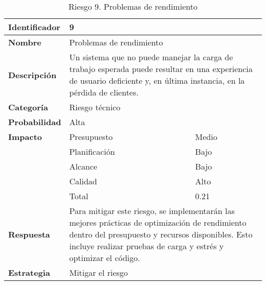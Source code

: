 \begin{table}[H]
    \centering
    \caption{Riesgo 9. Problemas de rendimiento}
    \label{table:risk_rendimiento}
    \begin{tabular}{>{\columncolor{lightgreen!20}}l l l}
    \toprule
    \rowcolor{lightgreen}
    \textbf{Identificador} & \multicolumn{2}{l}{9} \\
    \midrule
    \textbf{Nombre} & \multicolumn{2}{l}{Problemas de rendimiento} \\
    \midrule
    \textbf{Descripción} & \multicolumn{2}{p{10cm}}{Un sistema que no puede manejar la carga de trabajo esperada puede resultar en una experiencia de usuario deficiente y,
    en última instancia, en la pérdida de clientes.} \\
    \midrule
    \textbf{Categoría} & \multicolumn{2}{l}{Riesgo técnico} \\
    \midrule
    \textbf{Probabilidad} & \multicolumn{2}{l}{Alta} \\
    \midrule
    \textbf{Impacto} & Presupuesto & Medio \\
    \cmidrule(lr){2-3}
    & Planificación & Bajo \\
    \cmidrule(lr){2-3}
    & Alcance & Bajo \\
    \cmidrule(lr){2-3}
    & Calidad & Alto \\
    \cmidrule(lr){2-3}
    & Total & 0.21 \\
    \midrule
    \textbf{Respuesta} & \multicolumn{2}{p{10cm}}{Para mitigar este riesgo, se implementarán las mejores prácticas de optimización de rendimiento dentro del presupuesto y recursos disponibles. Esto incluye realizar pruebas de carga y estrés y optimizar el código.} \\
    \midrule
    \textbf{Estrategia} & \multicolumn{2}{l}{Mitigar el riesgo} \\
    \bottomrule
    \end{tabular}
\end{table}



